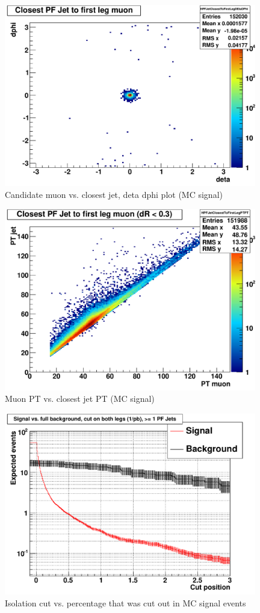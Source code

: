 \documentclass[10pt,a4paper,onecolumn]{article}
\begin{document}
\begin{figure}
\includegraphics[width=110mm]{HPFJetClosestToFirstLegDEtaDPhi.pdf}
\caption{Candidate muon vs. closest jet, deta dphi plot (MC signal)}
\label{Figure_CandidateMuonVsClosestJetEtaPhi}
\end{figure}

\begin{figure}
\includegraphics[width=110mm]{HPFJetClosestToFirstLegPTPT.pdf}
\caption{Muon PT vs. closest jet PT (MC signal)}
\label{Figure_CandidateMuonVsClosestJetPT}
\end{figure}

\begin{figure}
\includegraphics[width=110mm]{DoubleLeg_WithQCD_1PFJet.pdf}
\caption{Isolation cut vs. percentage that was cut out in MC signal events}
\label{Figure_IsolationCutVsRejectionPercentage}
\end{figure}
\end{document}
